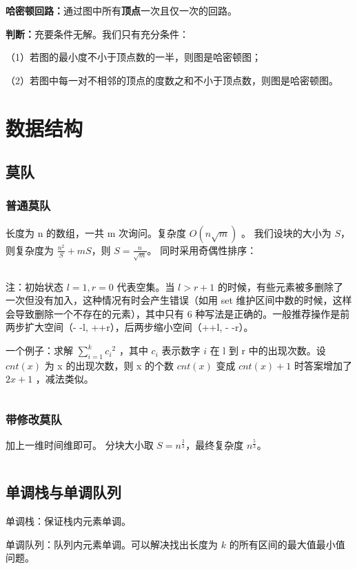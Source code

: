\documentclass[a4paper,11pt]{article}
\begin{document}
\textbf{哈密顿回路：}通过图中所有\textbf{顶点}一次且仅一次的回路。

\textbf{判断：}充要条件无解。我们只有充分条件：

（1）若图的最小度不小于顶点数的一半，则图是哈密顿图；

（2）若图中每一对不相邻的顶点的度数之和不小于顶点数，则图是哈密顿图。


\newpage
\section{数据结构}
\subsection{莫队}
\subsubsection{普通莫队}
长度为 n 的数组，一共 m 次询问。复杂度 \(O(n\sqrt {m})\) 。
我们设块的大小为 \(S\)，则复杂度为 \(\frac{n^2}{S}+mS\)，则 \(S=\frac{n}{\sqrt m}\)。
同时采用奇偶性排序：
\inputminted[linenos]{c++}{structure/moduisort.cpp}

注：初始状态 \(l=1, r=0\) 代表空集。当 \(l>r+1\) 的时候，有些元素被多删除了一次但没有加入，这种情况有时会产生错误（如用 set 维护区间中数的时候，这样会导致删除一个不存在的元素），其中只有 6 种写法是正确的。一般推荐操作是前两步扩大空间（- -l, ++r），后两步缩小空间（++l, - -r）。

一个例子：求解 \(\sum_{i=1}^{k}{{c_i}^2}\) ，其中 \(c_i\) 表示数字 \(i\) 在 l 到 r 中的出现次数。设 \(cnt(x)\) 为 x 的出现次数，则 x 的个数 \(cnt(x)\) 变成 \(cnt(x)+1\) 时答案增加了 \(2x+1\) ，减法类似。
\inputminted[linenos]{c++}{structure/modui.cpp}

\subsubsection{带修改莫队}
加上一维时间维即可。
分块大小取 \(S=n^\frac{2}{3}\)，最终复杂度 \(n^\frac{5}{3}\)。
\inputminted[linenos]{c++}{structure/moduimodify.cpp}
\subsection{单调栈与单调队列}

单调栈：保证栈内元素单调。

单调队列：队列内元素单调。可以解决找出长度为 \(k\) 的所有区间的最大值最小值问题。
\end{document}
